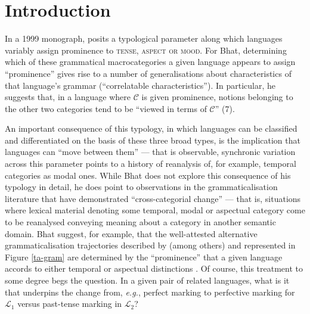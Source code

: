 
\chapter{Introduction}

In a 1999 monograph, \citeauthor{Bhat1999} posits a typological parameter along which languages variably assign prominence to \textsc{tense, aspect \textup{or} mood}. For Bhat, determining which of these grammatical macrocategories a given language appears to assign ``prominence'' gives rise to a number of generalisations about characteristics of that language's grammar (``correlatable characteristics''). In particular, he suggests that, in a language where $ \mathcal C $ is given prominence, notions belonging to the other two categories tend to be ``viewed in terms of $ \mathcal C $'' (7).


An important consequence of this typology, in which languages can be classified and differentiated on the basis of these three broad types, is the implication that languages can ``move between them'' --- that is observable, synchronic variation across this parameter points to a history of reanalysis of, for example, temporal categories as modal ones. While Bhat does not explore this consequence of his typology in detail, he does point to observations in the grammaticalisation literature that have demonstrated ``cross-categorial change'' --- that is, situations where lexical material denoting some temporal, modal or aspectual category come to be reanalysed conveying meaning about a category in another semantic domain. Bhat suggest, for example, that the well-attested alternative grammaticalisation trajectories described by \cite{Bybee1994} (among others) and represented in Figure \ref{ta-gram} are determined by the ``prominence'' that a given language accords to either temporal or aspectual distinctions \citeyearpar[182]{Bhat1999}. Of course, this treatment to some degree begs the question. In a given pair of related languages, what is it that underpins the change from, \textit{e.g.}, perfect marking to perfective marking for $ \mathcal L_1 $ versus past-tense marking in $ \mathcal{L}_2 $?

